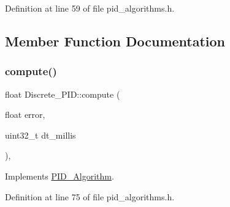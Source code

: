 Definition at line 59 of file pid\+\_\+algorithms.\+h.



\subsection{Member Function Documentation}
\mbox{\label{class_discrete___p_i_d_aa4914b85e73cb5fdfcc5b40e8d0ff23c}} 
\subsubsection{\texorpdfstring{compute()}{compute()}}
{\footnotesize\ttfamily float Discrete\+\_\+\+P\+I\+D\+::compute (\begin{DoxyParamCaption}\item[{float}]{error,  }\item[{uint32\+\_\+t}]{dt\+\_\+millis }\end{DoxyParamCaption})\hspace{0.3cm}{\ttfamily [inline]}, {\ttfamily [virtual]}}



Implements \mbox{\hyperlink{class_p_i_d___algorithm_a388ec97d23c981e62c3726505688e1f0}{P\+I\+D\+\_\+\+Algorithm}}.



Definition at line 75 of file pid\+\_\+algorithms.\+h.


